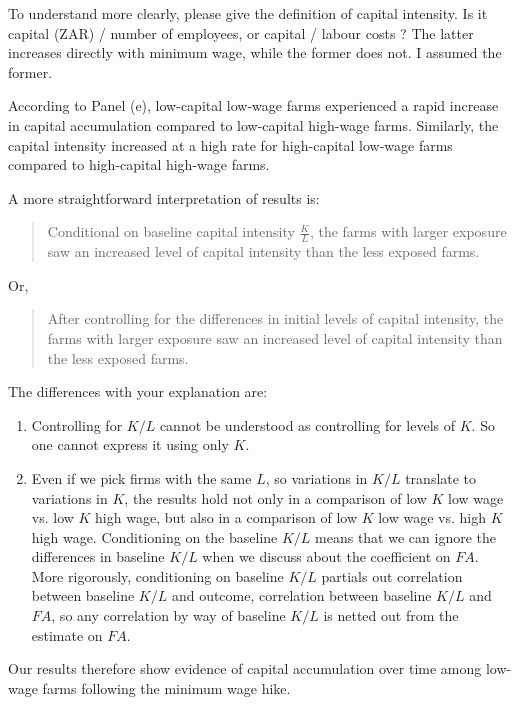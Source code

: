 To understand more clearly, please give the definition of capital intensity. Is it capital (ZAR) / number of employees, or capital / labour costs ? The latter increases directly with minimum wage, while the former does not. I assumed the former.

\begin{lightgrayleftbar}
According to Panel (e), low-capital low-wage farms experienced a rapid increase in capital accumulation compared to low-capital high-wage farms. Similarly, the capital intensity increased at a high rate for high-capital low-wage farms compared to high-capital high-wage farms.
\end{lightgrayleftbar}

A more straightforward interpretation of results is:

\begin{quotation}
Conditional on baseline capital intensity $\frac{K}{L}$, the farms with larger exposure saw an increased level of capital intensity than the less exposed farms.
\end{quotation}
Or,
\begin{quotation}
After controlling for the differences in initial levels of capital intensity, the farms with larger exposure saw an increased level of capital intensity than the less exposed farms.
\end{quotation}

The differences with your explanation are:
\begin{enumerate}
\vspace{1.0ex}\setlength{\itemsep}{1.0ex}\setlength{\baselineskip}{12pt}
\item	Controlling for $K/L$ cannot be understood as controlling for levels of $K$. So one cannot express it using only $K$.
\item	Even if we pick firms with the same $L$, so variations in $K/L$ translate to variations in $K$, the results hold not only in a comparison of low $K$ low wage vs. low $K$ high wage, but also in a comparison of low $K$ low wage vs. high $K$ high wage. Conditioning on the baseline $K/L$ means that we can ignore the differences in baseline $K/L$ when we discuss about the coefficient on $FA$. More rigorously, conditioning on baseline $K/L$ partials out correlation between baseline $K/L$ and outcome, correlation between baseline $K/L$ and $FA$, so any correlation by way of baseline $K/L$ is netted out from the estimate on $FA$. 
\end{enumerate}


\begin{lightgrayleftbar}
Our results therefore show evidence of capital accumulation over time among low-wage farms following the minimum wage hike.
\end{lightgrayleftbar}

